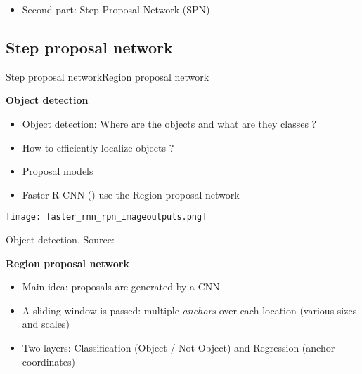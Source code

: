 \begin{frame}{\algo}{}

    
\medskip
\begin{itemize}
\centering
    \item Second part: Step Proposal Network (SPN)
\end{itemize}
\end{frame}

\subsection{Step proposal network}

\begin{frame}{Step proposal network}{Region proposal network}



\begin{minipage}[t]{0.45\linewidth}\vspace{0pt}

\centering\textbf{Object detection}
\begin{itemize}
    \item Object detection: Where are the objects and what are they classes ?
    \item How to efficiently localize objects ?
    \item Proposal models
    \item Faster R-CNN (\citet{ren2015faster}) use the Region proposal network
\end{itemize}
    \centering
    \texttt{[image: faster\_rnn\_rpn\_imageoutputs.png]}\\
    \smallskip
    \centerline{\small Object detection. Source:\citet{ren2015faster}}
\end{minipage}\hfill
\begin{minipage}[t]{0.54\linewidth}\vspace{0pt}
\centering\textbf{Region proposal network}
\begin{itemize}
    \item Main idea: proposals are generated by a CNN
    \item A sliding window is passed: multiple \emph{anchors} over each location (various sizes and scales)
    \item Two layers: Classification (Object / Not Object) and Regression (anchor coordinates)
\end{itemize}
    

\end{minipage}
\end{frame}
